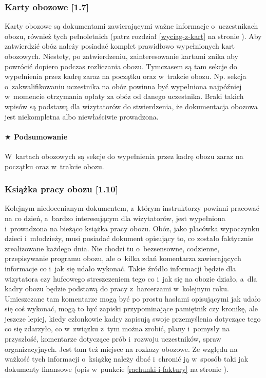\documentclass[a5paper,10pt,titlepage,twoside]{article}
\newcommand*{\thecheckbox}{\hss$\Box$} %
\newenvironment*{checklist}
{\list{}{%
\renewcommand*{\makelabel}[1]{\thecheckbox}}}
{\endlist}
\begin{document}
\subsubsection{Karty obozowe [1.7]}
Karty obozowe są dokumentami zawierającymi ważne informacje o~uczestnikach obozu, również tych pełnoletnich (patrz rozdział \ref{wyciag-z-kart} na stronie \pageref{wyciag-z-kart}). Aby zatwierdzić obóz należy posiadać komplet prawidłowo wypełnionych kart obozowych. Niestety, po zatwierdzeniu, zainteresowanie kartami znika aby powrócić dopiero podczas rozliczania obozu. Tymczasem są tam sekcje do wypełnienia przez kadrę zaraz na początku oraz w~trakcie obozu. Np. sekcja o~zakwalifikowaniu uczestnika na obóz powinna być wypełniona najpóźniej w~momencie otrzymania opłaty za obóz od danego uczestnika. Braki takich wpisów są podstawą dla wizytatorów do stwierdzenia, że dokumentacja obozowa jest niekompletna albo niewłaściwie prowadzona.
\paragraph{$\bigstar$ Podsumowanie}
\begin{checklist}
\item W~kartach obozowych są sekcje do wypełnienia przez kadrę obozu zaraz na początku oraz w~trakcie obozu.
\end{checklist}
\subsubsection{Książka pracy obozu [1.10]}
Kolejnym niedocenianym dokumentem, z~którym instruktorzy powinni pracować na co dzień, a~bardzo interesującym dla wizytatorów, jest wypełniona i~prowadzona na bieżąco książka pracy obozu. Obóz, jako placówka wypoczynku dzieci i~młodzieży, musi posiadać dokument opisujący to, co zostało faktycznie zrealizowane każdego dnia. Nie chodzi tu o~bezsensowne, codzienne, przepisywanie programu obozu, ale o~kilka zdań komentarza zawierających informacje co i~jak się udało wykonać. Takie źródło informacji będzie dla wizytatora czy hufcowego streszczeniem tego co i~jak się na obozie działo, a~dla kadry obozu będzie podstawą do pracy z~harcerzami w~kolejnym roku. Umieszczane tam komentarze mogą być po prostu hasłami opisującymi jak udało się coś wykonać, mogą to być zapiski przypominające pamiętnik czy kronikę, ale jeszcze lepiej, kiedy członkowie kadry zapisują swoje przemyślenia dotyczące tego co się zdarzyło, co w~związku z~tym można zrobić, plany i~pomysły na przyszłość, komentarze dotyczące prób i~rozwoju uczestników, spraw organizacyjnych. Jest tam też miejsce na rozkazy obozowe. Ze względu na ważkość tych informacji o~książkę należy dbać i~chronić ją w~sposób taki jak dokumenty finansowe (opis w~punkcie \ref{rachunki-i-faktury} na stronie \pageref{rachunki-i-faktury}).
\end{document}
